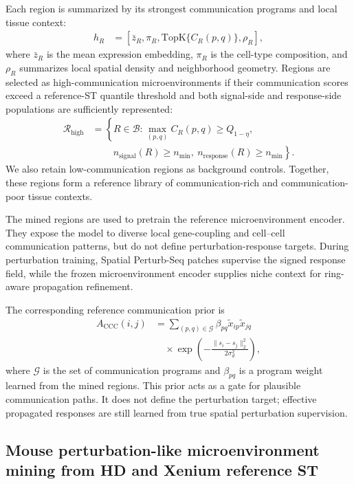 \documentclass[sigconf,anonymous,review]{acmart}
\begin{document}
Each region is summarized by its strongest communication programs and local tissue context:
\[
\begin{aligned}
h_R
&=
[\bar z_R,\pi_R,\mathrm{TopK}\{C_R(p,q)\},\rho_R],
\end{aligned}
\]
where $\bar z_R$ is the mean expression embedding, $\pi_R$ is the cell-type composition, and $\rho_R$ summarizes local spatial density and neighborhood geometry. Regions are selected as high-communication microenvironments if their communication scores exceed a reference-ST quantile threshold and both signal-side and response-side populations are sufficiently represented:
\[
\begin{aligned}
\mathcal R_{\mathrm{high}}
&=
\left\{
R\in\mathcal B:
\max_{(p,q)}C_R(p,q)\ge Q_{1-\eta},
\right.\\
&\qquad\left.
\ n_{\mathrm{signal}}(R)\ge n_{\min},
\ n_{\mathrm{response}}(R)\ge n_{\min}
\right\}.
\end{aligned}
\]
We also retain low-communication regions as background controls. Together, these regions form a reference library of communication-rich and communication-poor tissue contexts.

The mined regions are used to pretrain the reference microenvironment encoder. They expose the model to diverse local gene-coupling and cell--cell communication patterns, but do not define perturbation-response targets. During perturbation training, Spatial Perturb-Seq patches supervise the signed response field, while the frozen microenvironment encoder supplies niche context for ring-aware propagation refinement.

The corresponding reference communication prior is
\[
\begin{aligned}
A_{\mathrm{CCC}}(i,j)
&=
\sum_{(p,q)\in\mathcal G}
\beta_{pq}
\tilde x_{ip}\tilde x_{jq}\\
&\quad \times
\exp\!\left(
-\frac{\|s_i-s_j\|_2^2}{2\sigma_d^2}
\right),
\end{aligned}
\]
where $\mathcal G$ is the set of communication programs and $\beta_{pq}$ is a program weight learned from the mined regions. This prior acts as a gate for plausible communication paths. It does not define the perturbation target; effective propagated responses are still learned from true spatial perturbation supervision.

\subsection{Mouse perturbation-like microenvironment mining from HD and Xenium reference ST}
\label{app:mouse_microenvironment_mining}
\end{document}
